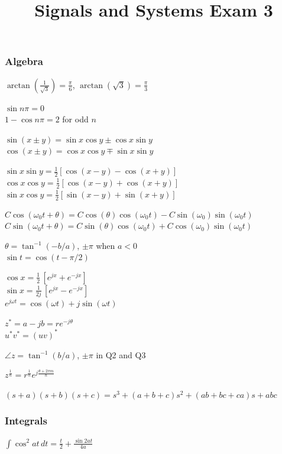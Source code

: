 \documentclass[4pt]{article}
\title{Signals and Systems Exam 3}
\theoremstyle{definition}
\theoremstyle{definition}
\renewcommand{\o}{\omega}
\begin{document}
\begin{landscape}
\raggedright
\begin{multicols}{3} %
\raggedcolumns
\subsubsection*{Algebra}
    $\arctan(\frac{1}{\sqrt{3}}) = \frac{\pi}{6}$,  $\arctan(\sqrt{3}) = \frac{\pi} 3$

    $\sin n\pi = 0$\\
    $1-\cos n\pi = 2$ for odd $n$

    $\sin(x\pm y) = \sin x \cos y \pm \cos x \sin y$\\
    $\cos(x\pm y) = \cos x \cos y \mp \sin x \sin y$

    $\sin x \sin y = \frac{1}{2}[\cos(x-y) - \cos(x+y)]$\\ %
    $\cos x \cos y = \frac{1}{2}[\cos(x-y) + \cos(x+y)]$\\
    $\sin x \cos y = \frac{1}{2}[\sin(x-y) + \sin(x+y)]$

    $C \cos(\o_0 t + \theta) = C\cos(\theta) \cos(\o_0 t) - C\sin(\o_0)\sin(\o_0 t)$\\        %
    $C \sin(\o_0 t + \theta) = C\sin(\theta) \cos(\o_0 t) + C\cos(\o_0)\sin(\o_0 t)$

    $\theta = \tan^{-1} (-b/a)$, $\pm \pi$ when $a<0$\\
    $\sin t = \cos (t-\pi/2)$

    $\cos x = \frac{1}{2}\,[e^{jx} + e^{-jx}]$\\
    $\sin x = \frac{1}{2j}\, [e^{jx} - e^{-jx}]$\\
    $e^{j\o t} = \cos(\o t) + j\sin (\o t)$

    $z^* = a-jb = re^{-j\theta}$\\
    $u^* v^* = (uv)^*$

    $\angle z = \tan^{-1}(b/a)$, $\pm \pi$ in Q2 and Q3

    $z^{\frac 1 n} = r^{\frac 1 n} e^{j \frac{\theta + 2\pi m}{n}}$

    \((s+a)(s+b)(s+c) = s^3 + (a+b+c) s^2 + (ab+bc+ca)s + abc\)
\subsubsection*{Integrals}
    $\int \cos^2 at \, dt = \frac{t}{2} + \frac{\sin2at}{4a}$


\end{multicols}
\end{landscape}
\end{document}
